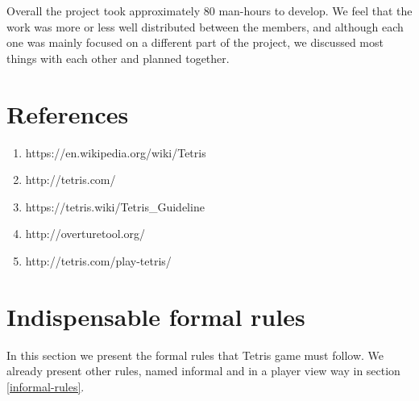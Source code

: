 \documentclass[a4paper]{article}
\begin{document}
Overall the project took approximately 80 man-hours to develop. We feel that the work was more or less well distributed between the members, and although each one was mainly focused on a different part of the project, we discussed most things with each other and planned together.

\section{References}

\begin{enumerate}
	
\item https://en.wikipedia.org/wiki/Tetris
\item http://tetris.com/
\item https://tetris.wiki/Tetris\_Guideline
\item http://overturetool.org/
\item http://tetris.com/play-tetris/

\end{enumerate}

\newpage
\appendix

\section{Indispensable formal rules}\label{rules}
In this section we present the formal rules that Tetris game must follow. We already present other rules, named informal and in a player view way in section \ref{informal-rules}.
\end{document}
